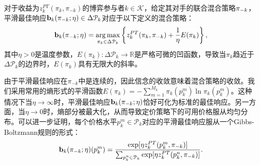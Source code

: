 \begin{df}[平滑最佳响应]
对于收益为$z^{PT}_k(\pi_k,\pi_{-k})$的博弈参与者$k\in\mathcal{K}$，给定其对手的联合混合策略$\pi_{-k}$，平滑最佳响应$\bold{b}_k(\pi_{-k};\eta)\in\Delta\mathcal{P}_k$对应于以下定义的混合策略：
\begin{equation}\label{sbr0}
\bold{b}_k(\pi_{-k};\eta)=\underset{\pi_k\in\Delta\mathcal{P}_k}{\arg\max}\left\{z_k^{PT}(\pi_k,\pi_{-k})+\frac{1}{\eta}E(\pi_k)\right\},
\end{equation}
其中$\eta>0$是温度参数，$E(\pi_k):\Delta\mathcal{P}_k\rightarrow \mathbb{R}$是严格可微的凹函数，导致当$\pi_k$趋近于$\Delta\mathcal{P}_k$的边界时，$E(\pi_k)$具有无限大的斜率。
\end{df}

由于平滑最佳响应在$\pi_{-k}$中是连续的，因此信念的收敛意味着混合策略的收敛。我们采用常用的熵形式的平滑函数$E(\pi_k)=-\sum_{m=1}^{M_k}\pi_k(p_{k}^{m})\ln \pi_k(p_{k}^{m})$。这种情况下当$\eta\rightarrow\infty$时，平滑最佳响应$\bold{b}_k(\pi_{-k}; \eta)$恰好可化为标准的最佳响应。另一方面，当$\eta\rightarrow0$时，熵部分被最大化，从而导致定价策略下的可用价格服从均匀分布。可以进一步证明，每个价格水平$p_k^{m}\in\mathcal{P}_k$对应的平滑最佳响应服从一个Gibbs-Boltzmann规则的形式：
\begin{equation}\label{eq:gibbs}
\bold{b}_k(\pi_{-k};\eta)(p_k^{m})=\frac{\exp[\eta z^{PT}_k(p_k^{m}, \pi_{-k})]}{\sum_{p_k^n\in\mathcal{P}_k}\exp[\eta z^{PT}_k(p_k^n, \pi_{-k})]}.
\end{equation}

